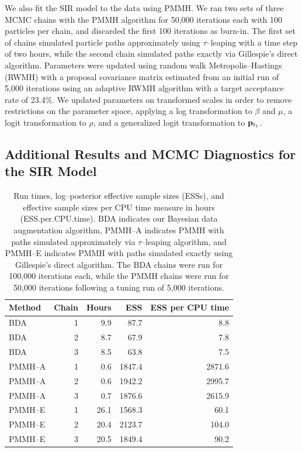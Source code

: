 We also fit the SIR model to the data using PMMH. We ran two sets of three MCMC chains with the PMMH algorithm for 50,000 iterations each with 100 particles per chain, and discarded the first 100 iterations as burn-in. The first set of chains simulated particle paths approximately using $ \tau $--leaping with a time step of two hours, while the second chain simulated paths exactly via Gillespie's direct algorithm. Parameters were updated using random walk Metropolis--Hastings (RWMH) with a proposal covariance matrix estimated from an initial run of 5,000 iterations using an adaptive RWMH algorithm with a target acceptance rate of 23.4\%. We updated parameters on transformed scales in  order to remove restrictions on the parameter space, applying a log transformation to $ \beta $ and $ \mu $, a logit transformation to $ \rho $, and a generalized logit transformation to $ \mathbf{p}_{t_1} $.

\newpage
\subsection{Additional Results and MCMC Diagnostics for the SIR Model}
\begin{table}[htbp]
	\centering
	\begin{tabular}{lrrrr}
		\hline
		Method & Chain & Hours & ESS & ESS per CPU time \\ 
		\hline
		BDA &  1 & 9.9 & 87.7 & 8.8 \\ 
		BDA &  2 & 8.7 & 67.9 & 7.8 \\ 
		BDA &  3 & 8.5 & 63.8 & 7.5 \\ 
		PMMH--A &  1 & 0.6 & 1847.4 & 2871.6 \\ 
		PMMH--A &  2 & 0.6 & 1942.2 & 2995.7 \\ 
		PMMH--A &  3 & 0.7 & 1876.6 & 2615.9 \\ 
		PMMH--E &  1 & 26.1 & 1568.3 & 60.1 \\ 
		PMMH--E &  2 & 20.4 & 2123.7 & 104.0 \\ 
		PMMH--E &  3 & 20.5 & 1849.4 & 90.2 \\ 
		\hline
	\end{tabular}
	\caption[Simulation 1 log--posterior effective sample sizes and run times.]{Run times, log--posterior effective sample sizes (ESSs), and effective sample sizes per CPU time measure in hours (ESS.per.CPU.time). BDA indicates our Bayesian data augmentation algorithm, PMMH--A indicates PMMH with paths simulated approximately via $ \tau $--leaping algorithm, and PMMH--E indicates PMMH with paths simulated exactly using Gillespie's direct algorithm. The BDA chains were run for 100,000 iterations each, while the PMMH chains were run for 50,000 iterations following a tuning run of 5,000 iterations.}
	\label{tab:sim1_sir_ess}
\end{table}

